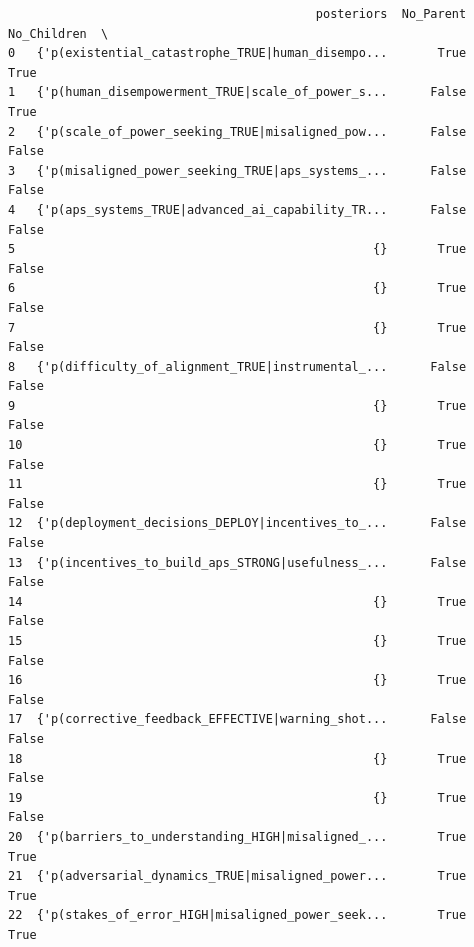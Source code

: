 \documentclass[
  11pt,
  letterpaper,
]{book}
\begin{document}
\begin{verbatim}
                                           posteriors  No_Parent  No_Children  \
0   {'p(existential_catastrophe_TRUE|human_disempo...       True         True   
1   {'p(human_disempowerment_TRUE|scale_of_power_s...      False         True   
2   {'p(scale_of_power_seeking_TRUE|misaligned_pow...      False        False   
3   {'p(misaligned_power_seeking_TRUE|aps_systems_...      False        False   
4   {'p(aps_systems_TRUE|advanced_ai_capability_TR...      False        False   
5                                                  {}       True        False   
6                                                  {}       True        False   
7                                                  {}       True        False   
8   {'p(difficulty_of_alignment_TRUE|instrumental_...      False        False   
9                                                  {}       True        False   
10                                                 {}       True        False   
11                                                 {}       True        False   
12  {'p(deployment_decisions_DEPLOY|incentives_to_...      False        False   
13  {'p(incentives_to_build_aps_STRONG|usefulness_...      False        False   
14                                                 {}       True        False   
15                                                 {}       True        False   
16                                                 {}       True        False   
17  {'p(corrective_feedback_EFFECTIVE|warning_shot...      False        False   
18                                                 {}       True        False   
19                                                 {}       True        False   
20  {'p(barriers_to_understanding_HIGH|misaligned_...       True         True   
21  {'p(adversarial_dynamics_TRUE|misaligned_power...       True         True   
22  {'p(stakes_of_error_HIGH|misaligned_power_seek...       True         True   


\end{verbatim}
\end{document}
